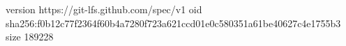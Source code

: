 version https://git-lfs.github.com/spec/v1
oid sha256:f0b12c77f2364f60b4a7280f723a621ccd01e0c580351a61be40627c4e1755b3
size 189228

